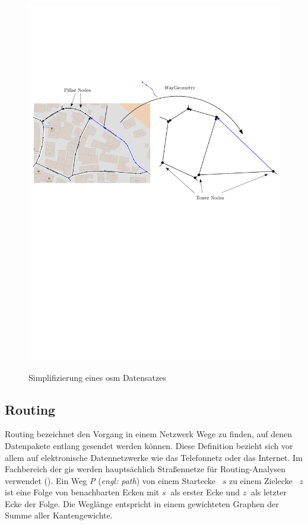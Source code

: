 \begin{figure}[h]
\centering
\includegraphics[width = \textwidth]{../media/towers.pdf} \\
\caption{Simplifizierung eines \gls{osm} Datensatzes}
\label{fig:tower}
\end{figure}

\subsection{Routing}

Routing bezeichnet den Vorgang in einem Netzwerk Wege zu finden, auf denen Datenpakete entlang gesendet werden können.
Diese Definition bezieht sich vor allem auf elektronische Datennetzwerke wie das Telefonnetz oder das Internet.
Im Fachbereich der \gls{gis} werden hauptsächlich Straßennetze für Routing-Analysen verwendet (\cite[165]{handbook}).
Ein Weg \textit{P} (\textit{engl: path}) von einem Startecke ~$s$ zu einem Zielecke ~$z$ ist eine Folge von benachbarten Ecken mit $s~$ als erster Ecke und $z~$ als letzter Ecke der Folge.
Die Weglänge entspricht in einem gewichteten Graphen der Summe aller Kantengewichte.

